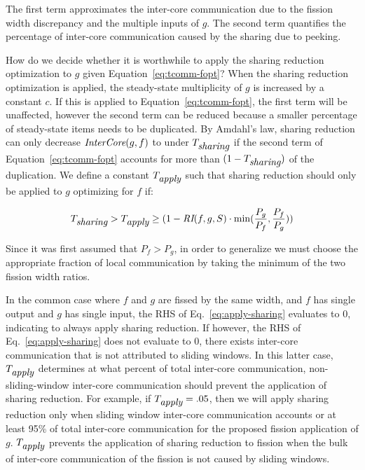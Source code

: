 \noindent The first term approximates the inter-core communication due
to the fission width discrepancy and the multiple inputs of $g$.  The
second term quantifies the percentage of inter-core communication
caused by the sharing due to peeking.

How do we decide whether it is worthwhile to apply the sharing
reduction optimization to $g$ given Equation~\ref{eq:tcomm-fopt}? When
the sharing reduction optimization is applied, the steady-state
multiplicity of $g$ is increased by a constant $c$.  If this is
applied to Equation~\ref{eq:tcomm-fopt}, the first term will be
unaffected, however the second term can be reduced because a smaller
percentage of steady-state items needs to be duplicated.  By Amdahl's
law, sharing reduction can only decrease $\mbox{\it InterCore}(g,
f)$ to under $T_{\mbox{\it sharing}}$ if the second term of Equation~\ref{eq:tcomm-fopt}
accounts for more than $(1-T_{\mbox{\it sharing}} )$ of the duplication.  We
define a constant $T_{\mbox{\it apply}}$ such that sharing
reduction should only be applied to $g$ optimizing for $f$ if:

\begin{equation}
\label{eq:apply-sharing}
T_{\mt{sharing}}  >  T_{\mt{apply}} \ge (1 -\mt{RI}(f,g, S) \cdot
\min(\frac{P_g}{P_f}, \frac{P_f}{P_g}))
\end{equation}


\noindent Since it was first assumed that $P_f > P_g$, in order to
generalize we must choose the appropriate fraction of local
communication by taking the minimum of the two fission width ratios.

In the common case where $f$ and $g$ are fissed by the same width, and
$f$ has single output and $g$ has single input, the RHS of
Eq.~\ref{eq:apply-sharing} evaluates to 0, indicating to always apply
sharing reduction.  If however, the RHS of Eq.~\ref{eq:apply-sharing}
does not evaluate to 0, there exists inter-core communication that is
not attributed to sliding windows.  In this latter case,
$T_{\mbox{\it apply}}$ determines at what percent of total inter-core
communication, non-sliding-window inter-core communication should
prevent the application of sharing reduction.  For example, if
$T_{\mbox{\it apply}} = .05$, then we will apply sharing reduction only when
sliding window inter-core communication accounts or at least 95\% of
total inter-core communication for the proposed fission application of
$g$. $T_{\mbox{\it apply}}$ prevents the application of sharing reduction to
fission when the bulk of inter-core communication of the fission is
not caused by sliding windows.

